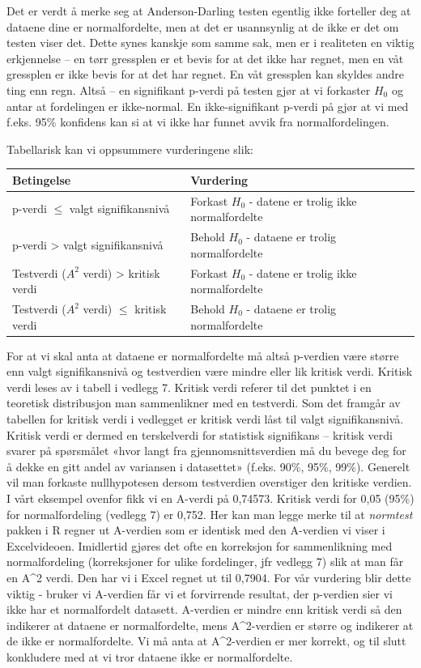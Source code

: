 \documentclass[
]{book}
\begin{document}
Det er verdt å merke seg at Anderson-Darling testen egentlig ikke forteller deg at dataene dine er normalfordelte, men at det er usannsynlig at de ikke er det om testen viser det. Dette synes kanskje som samme sak, men er i realiteten en viktig erkjennelse -- en tørr gressplen er et bevis for at det ikke har regnet, men en våt gressplen er ikke bevis for at det har regnet. En våt gressplen kan skyldes andre ting enn regn. Altså -- en signifikant p-verdi på testen gjør at vi forkaster \(H_0\) og antar at fordelingen er ikke-normal. En ikke-signifikant p-verdi på gjør at vi med f.eks. 95\% konfidens kan si at vi ikke har funnet avvik fra normalfordelingen.

Tabellarisk kan vi oppsummere vurderingene slik:

\begin{table}[!h]
\centering
\begin{tabular}{l|l}
\hline
Betingelse & Vurdering\\
\hline
p-verdi $\le$ valgt signifikansnivå & Forkast $H_0$ - datene er trolig ikke normalfordelte\\
\hline
p-verdi > valgt signifikansnivå & Behold $H_0$ - dataene er trolig normalfordelte\\
\hline
Testverdi ($A^2$ verdi) > kritisk verdi & Forkast $H_0$ - datene er trolig ikke normalfordelte\\
\hline
Testverdi ($A^2$ verdi) $\le$ kritisk verdi & Behold $H_0$ - dataene er trolig normalfordelte\\
\hline
\end{tabular}
\end{table}

For at vi skal anta at dataene er normalfordelte må altså p-verdien være større enn valgt signifikansnivå og testverdien være mindre eller lik kritisk verdi. Kritisk verdi leses av i tabell i vedlegg 7. Kritisk verdi referer til det punktet i en teoretisk distribusjon man sammenlikner med en testverdi. Som det framgår av tabellen for kritisk verdi i vedlegget er kritisk verdi låst til valgt signifikansnivå. Kritisk verdi er dermed en terskelverdi for statistisk signifikans -- kritisk verdi svarer på spørsmålet «hvor langt fra gjennomsnittsverdien må du bevege deg for å dekke en gitt andel av variansen i datasettet» (f.eks. 90\%, 95\%, 99\%). Generelt vil man forkaste nullhypotesen dersom testverdien overstiger den kritiske verdien. I vårt eksempel ovenfor fikk vi en A-verdi på 0,74573. Kritisk verdi for 0,05 (95\%) for normalfordeling (vedlegg 7) er 0,752. Her kan man legge merke til at \emph{normtest} pakken i R regner ut A-verdien som er identisk med den A-verdien vi viser i Excelvideoen. Imidlertid gjøres det ofte en korreksjon for sammenlikning med normalfordeling (korreksjoner for ulike fordelinger, jfr vedlegg 7) slik at man får en A\^{}2 verdi. Den har vi i Excel regnet ut til 0,7904. For vår vurdering blir dette viktig - bruker vi A-verdien får vi et forvirrende resultat, der p-verdien sier vi ikke har et normalfordelt datasett. A-verdien er mindre enn kritisk verdi så den indikerer at dataene er normalfordelte, mens A\^{}2-verdien er større og indikerer at de ikke er normalfordelte. Vi må anta at A\^{}2-verdien er mer korrekt, og til slutt konkludere med at vi tror dataene ikke er normalfordelte.
\end{document}
